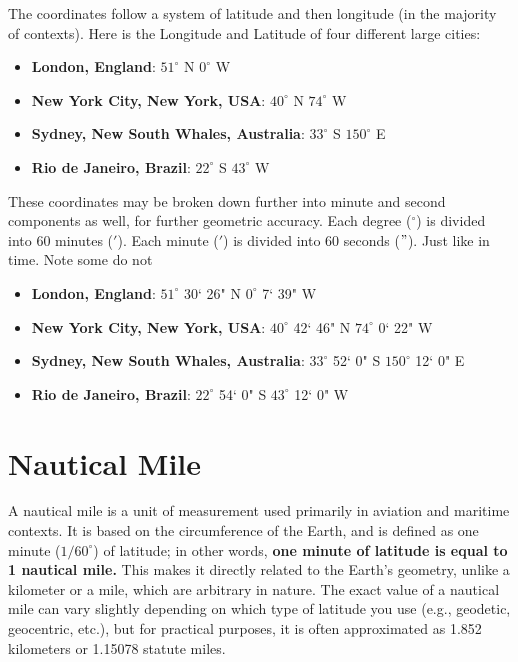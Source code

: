 The coordinates follow a system of latitude and then longitude (in the majority of contexts). Here is the Longitude and Latitude of four different large cities:
\begin{itemize}
  \item \textbf{London, England}: $51^\circ$ N $0^\circ$ W
  \item \textbf{New York City, New York, USA}: $40^\circ$ N $74^\circ$ W
  \item \textbf{Sydney, New South Whales, Australia}: $33^\circ$ S $150^\circ$ E
  \item \textbf{Rio de Janeiro, Brazil}: $22^\circ$ S $43^\circ$ W
\end{itemize}

These coordinates may be broken down further into minute and second components as well, for further geometric accuracy.
Each degree ($^\circ$) is divided into 60 minutes ($'$). Each minute ($'$) is divided into 60 seconds ($"$). Just like in time. Note some do not

\begin{itemize}
  \item \textbf{London, England}: $51^\circ$ 30` 26" N $0^\circ$ 7` 39" W
  \item \textbf{New York City, New York, USA}: $40^\circ$ 42` 46" N $74^\circ$ 0` 22" W
  \item \textbf{Sydney, New South Whales, Australia}: $33^\circ$ 52` 0" S $150^\circ$ 12` 0" E
  \item \textbf{Rio de Janeiro, Brazil}: $22^\circ$ 54` 0" S $43^\circ$ 12` 0" W
\end{itemize}

\section{Nautical Mile}
A nautical mile is a unit of measurement used primarily in aviation
and maritime contexts. It is based on the circumference of the Earth,
and is defined as one minute ($1/60^{\circ}$) of latitude; in other words, \textbf{one minute of latitude is equal to 1 nautical mile.} 
This makes it directly related to the Earth's geometry, unlike a kilometer or a
mile, which are arbitrary in nature. The exact value of a nautical
mile can vary slightly depending on which type of latitude you use
(e.g., geodetic, geocentric, etc.), but for practical purposes, it is
often approximated as 1.852 kilometers or 1.15078 statute miles.

